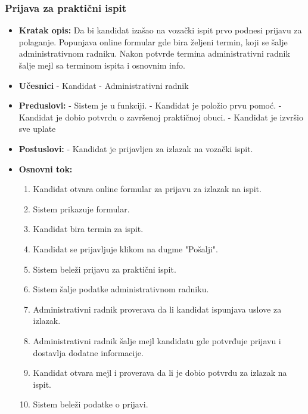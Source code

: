 \subsubsection{Prijava za praktični ispit}

\vspace{3mm}

\begin{itemize}

\item \textbf{Kratak opis:} Da bi kandidat izašao na vozački ispit prvo podnesi prijavu za polaganje. Popunjava online formular gde bira željeni termin, koji se  šalje administrativnom radniku. Nakon potvrde termina administrativni radnik šalje mejl sa terminom ispita i osnovnim info.

\vspace{2mm}

\item \textbf{Učesnici} \newline
   - Kandidat \newline   
   - Administrativni radnik 
   
\item \textbf{Preduslovi:} \newline
   - Sistem je u funkciji. \newline
   - Kandidat je položio prvu pomoć. \newline
   - Kandidat je dobio potvrdu o završenoj praktičnoj obuci. \newline
   - Kandidat je izvršio sve uplate

\item \textbf{Postuslovi:} \newline
    - Kandidat je prijavljen za izlazak na vozački ispit.

\item \textbf{Osnovni tok:}  
   \begin{enumerate}
   \item Kandidat otvara online formular za prijavu za izlazak na ispit.
   \item Sistem prikazuje formular.
   \item Kandidat bira termin za ispit.
   \item Kandidat se prijavljuje klikom na dugme "Pošalji".
   \item Sistem beleži prijavu za praktični ispit.
   \item Sistem šalje podatke administrativnom radniku.
   \item Administrativni radnik proverava da li kandidat ispunjava uslove za izlazak.
   \item Administrativni radnik šalje mejl kandidatu gde potvrđuje prijavu i dostavlja dodatne informacije.
   \item Kandidat otvara mejl i proverava da li je dobio potvrdu za izlazak na ispit. 
   \item Sistem beleži podatke o prijavi. 
   \end{enumerate}


\end{itemize}
